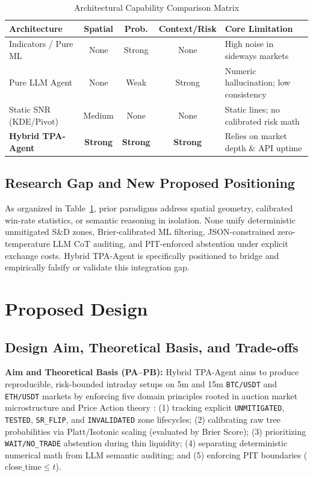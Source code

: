 \documentclass[conference]{IEEEtran}
\begin{document}
\begin{table}[t]
\centering
\caption{Architectural Capability Comparison Matrix}
\label{tab:arch_compare}
\scriptsize
\setlength{\tabcolsep}{3.5pt}
\begin{tabular}{p{2.1cm} c c c p{2.2cm}}
\toprule
\textbf{Architecture} & \textbf{Spatial} & \textbf{Prob.} & \textbf{Context/Risk} & \textbf{Core Limitation} \\
\midrule
Indicators / Pure ML & None & Strong & None & High noise in sideways markets \\
Pure LLM Agent & None & Weak & Strong & Numeric hallucination; low consistency \\
Static SNR (KDE/Pivot) & Medium & None & None & Static lines; no calibrated risk math \\
\textbf{Hybrid TPA-Agent} & \textbf{Strong} & \textbf{Strong} & \textbf{Strong} & Relies on market depth \& API uptime \\
\bottomrule
\end{tabular}
\end{table}

\subsection{Research Gap and New Proposed Positioning}
As organized in Table~\ref{tab:arch_compare}, prior paradigms address spatial geometry, calibrated win-rate statistics, or semantic reasoning in isolation. None unify deterministic unmitigated S\&D zones, Brier-calibrated ML filtering, JSON-constrained zero-temperature LLM CoT auditing, and PIT-enforced abstention under explicit exchange costs. Hybrid TPA-Agent is specifically positioned to bridge and empirically falsify or validate this integration gap.

\section{Proposed Design}
\label{sec:design}

\subsection{Design Aim, Theoretical Basis, and Trade-offs}
\textbf{Aim and Theoretical Basis (PA--PB):} Hybrid TPA-Agent aims to produce reproducible, risk-bounded intraday setups on 5m and 15m \texttt{BTC/USDT} and \texttt{ETH/USDT} markets by enforcing five domain principles rooted in auction market microstructure and Price Action theory \cite{brooks2012}: (1) tracking explicit \texttt{UNMITIGATED}, \texttt{TESTED}, \texttt{SR\_FLIP}, and \texttt{INVALIDATED} zone lifecycles; (2) calibrating raw tree probabilities via Platt/Isotonic scaling (evaluated by Brier Score); (3) prioritizing \texttt{WAIT/NO\_TRADE} abstention during thin liquidity; (4) separating deterministic numerical math from LLM semantic auditing; and (5) enforcing PIT boundaries ($\text{close\_time} \le t$).
\end{document}
